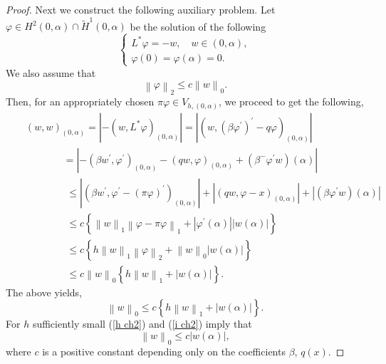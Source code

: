 \documentclass[11pt]{article}
\numberwithin{equation}{section}
\begin{document}
\begin{proof}
Next we construct the following auxiliary problem.
Let $\varphi \in H^{2}(0, \alpha)\cap \widetilde{H}^{1}\left(0, \alpha\right)$ be the solution of
the following
\begin{equation*}\label{}
\begin{cases}
 L^{*}\varphi =-w ,\quad   w\in \left(0 , \alpha\right),\\
\varphi\left(0\right)=\varphi\left(\alpha\right)=0.
 \end{cases}
\end{equation*}
 We also assume that
\begin{equation*}\label{}
\left\|\varphi\right\|_{2}\leq  c \left\|w\right\|_{0}.
\end{equation*}
Then, for an appropriately chosen $\pi\varphi \in V_{h,\left(0,\alpha\right)}$, we proceed to get the following,
\begin{eqnarray*}
&&\left(w , w\right)_{\left(0,\alpha\right)}=\left|-\left(w , L^{*}\varphi\right)_{\left(0,\alpha\right)}\right|=\left|\left(w , \left(\beta\varphi^{'}\right)^{'}-q\varphi\right)_{\left(0,\alpha\right)}\right|\\
&&\qquad~~~~~~~~=\left|-\left(\beta w^{'} , \varphi^{'}\right)_{\left(0,\alpha\right)}-\left(qw , \varphi \right)_{\left(0,\alpha\right)}+\left(\beta ^{-}\varphi^{'}w\right)\left(\alpha\right)\right|\\
&&\qquad\quad~~~~~\leq\left|\left(\beta w^{'} , \varphi^{'}-\left(\pi\varphi\right)^{'}\right)_{\left(0,\alpha\right)}\right|+\left|\left(qw , \varphi-x\right)_{\left(0,\alpha\right)}\right|+\left|\left(\beta\varphi^{'} w\right)\left(\alpha\right)\right|\\
&&\qquad\quad~~~~~\leq c \left\{\left\|w\right\|_{1}\left\|\varphi-\pi\varphi\right\|_{1}+\left|\varphi^{'}\left(\alpha\right)\right|\left|w\left(\alpha\right)\right|\right\}\\
&&\qquad\quad~~~~~\leq c \left\{h\left\|w\right\|_{1}\left\|\varphi\right\|_{2}+\left\|w\right\|_{0}\left|w\left(\alpha\right)\right|\right\}\\
&&\qquad\quad~~~~~\leq c\left\|w\right\|_{0}\left\{h\left\|w\right\|_{1}+\left|w\left(\alpha\right)\right|\right\}.
\end{eqnarray*}
The above yields,
\begin{equation}\label{i ch2}
\left\|w\right\|_{0}\leq c \left\{h\left\|w\right\|_{1}+\left|w\left(\alpha\right)\right|\right\}.
\end{equation}
For $h$ sufficiently small (\ref{h ch2}) and (\ref{i ch2}) imply that
\begin{equation}\label{}
\left\|w\right\|_{0}\leq c \left|w\left(\alpha\right)\right|,
\end{equation}
where $c$ is a positive constant depending only on the coefficients $\beta$, $q(x)$.


\end{proof}
\end{document}
